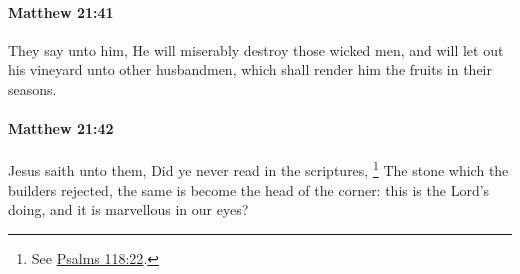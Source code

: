 		\paragraph{Matthew 21:41} %
			\label{MATTHEW-21-41}

			They say unto him, He will miserably destroy those wicked men, and will let out his vineyard unto other husbandmen, which shall render him the fruits in their seasons.

			\begin{framed}
			\scriptsize
				\begin{compactdesc}
					\item[SBLG] 
				\end{compactdesc}
			\end{framed}

		\paragraph{Matthew 21:42} %
			\label{MATTHEW-21-42}

			Jesus saith unto them, Did ye never read in the scriptures,
				\footnote{%
					See \hyperref[PSALMS-118-22]{Psalms 118:22}.
					}%
			The stone which the builders rejected, the same is become the head of the corner: this is the Lord's doing, and it is marvellous in our eyes?

